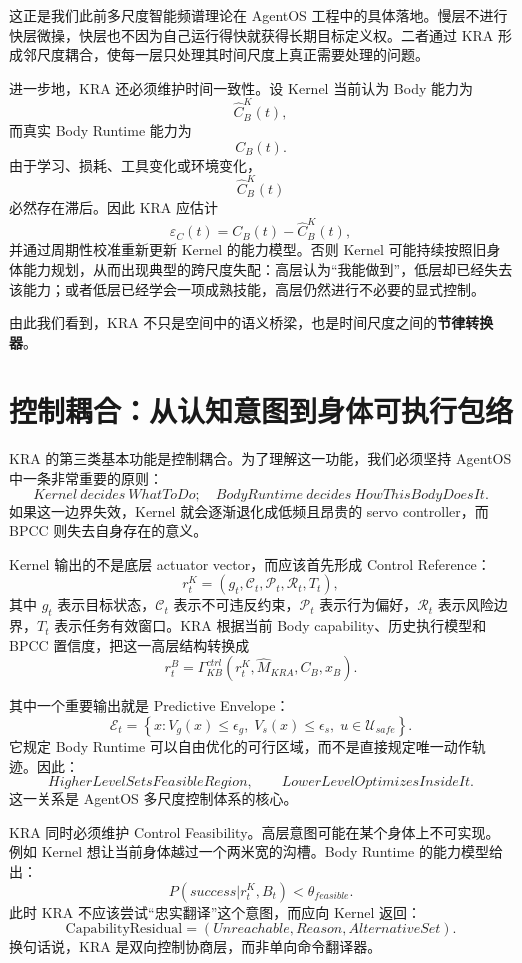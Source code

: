 这正是我们此前多尺度智能频谱理论在 AgentOS 工程中的具体落地。慢层不进行快层微操，快层也不因为自己运行得快就获得长期目标定义权。二者通过 KRA 形成邻尺度耦合，使每一层只处理其时间尺度上真正需要处理的问题。

进一步地，KRA 还必须维护时间一致性。设 Kernel 当前认为 Body 能力为
\[
\hat C^K_B(t),
\]
而真实 Body Runtime 能力为
\[
C_B(t).
\]
由于学习、损耗、工具变化或环境变化，
\[
\hat C^K_B(t)
\]
必然存在滞后。因此 KRA 应估计
\[
\varepsilon_C(t)
=
C_B(t)-\hat C^K_B(t),
\]
并通过周期性校准重新更新 Kernel 的能力模型。否则 Kernel 可能持续按照旧身体能力规划，从而出现典型的跨尺度失配：高层认为``我能做到''，低层却已经失去该能力；或者低层已经学会一项成熟技能，高层仍然进行不必要的显式控制。

由此我们看到，KRA 不只是空间中的语义桥梁，也是时间尺度之间的\textbf{节律转换器}。

\section{控制耦合：从认知意图到身体可执行包络}
\label{sec:kra-control-coupling}

KRA 的第三类基本功能是控制耦合。为了理解这一功能，我们必须坚持 AgentOS 中一条非常重要的原则：
\[
\boxed{
Kernel\ decides\ WhatToDo;
\quad
BodyRuntime\ decides\ HowThisBodyDoesIt.
}
\]
如果这一边界失效，Kernel 就会逐渐退化成低频且昂贵的 servo controller，而 BPCC 则失去自身存在的意义。

Kernel 输出的不是底层 actuator vector，而应该首先形成 Control Reference：
\[
r_t^K
=
\left(
g_t,
\mathcal C_t,
\mathcal P_t,
\mathcal R_t,
T_t
\right),
\]
其中 $g_t$ 表示目标状态，$\mathcal C_t$ 表示不可违反约束，$\mathcal P_t$ 表示行为偏好，$\mathcal R_t$ 表示风险边界，$T_t$ 表示任务有效窗口。KRA 根据当前 Body capability、历史执行模型和 BPCC 置信度，把这一高层结构转换成
\[
r_t^B
=
\Gamma_{KB}^{ctrl}
\left(
r_t^K,
\hat M_{KRA},
C_B,
x_B
\right).
\]

其中一个重要输出就是 Predictive Envelope：
\[
\mathcal E_t
=
\left\{
x:
V_g(x)\leq\epsilon_g,\;
V_s(x)\leq\epsilon_s,\;
u\in\mathcal U_{safe}
\right\}.
\]
它规定 Body Runtime 可以自由优化的可行区域，而不是直接规定唯一动作轨迹。因此：
\[
\boxed{
HigherLevelSetsFeasibleRegion,
\qquad
LowerLevelOptimizesInsideIt.
}
\]
这一关系是 AgentOS 多尺度控制体系的核心。

KRA 同时必须维护 Control Feasibility。高层意图可能在某个身体上不可实现。例如 Kernel 想让当前身体越过一个两米宽的沟槽。Body Runtime 的能力模型给出：
\[
P(success|r_t^K,B_t)
<\theta_{feasible}.
\]
此时 KRA 不应该尝试``忠实翻译''这个意图，而应向 Kernel 返回：
\[
\mathrm{CapabilityResidual}
=
\left(
Unreachable,
Reason,
AlternativeSet
\right).
\]
换句话说，KRA 是双向控制协商层，而非单向命令翻译器。

